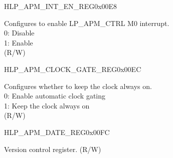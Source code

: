 \begin{register}{H}{LP\_APM\_INT\_EN\_REG}{0x00E8}\label{regdesc:LPAPMINTENREG}
%
%
\regnewline%
\begin{regdesc}\begin{reglist}
\label{fielddesc:LPAPMM0APMINTEN}\item [LP\_APM\_M0\_APM\_INT\_EN] Configures to enable LP\_APM\_CTRL M0 interrupt.\\ 
0: Disable \\ 
1: Enable  \\ (R/W)
\end{reglist}\end{regdesc}
\end{register}


\begin{register}{H}{LP\_APM\_CLOCK\_GATE\_REG}{0x00EC}\label{regdesc:LPAPMCLOCKGATEREG}
%
%
\regnewline%
\begin{regdesc}\begin{reglist}
\label{fielddesc:LPAPMCLKEN}\item [LP\_APM\_CLK\_EN] Configures whether to keep the clock always on.\\ 
0: Enable automatic clock gating \\ 
1: Keep the clock always on  \\ (R/W)
\end{reglist}\end{regdesc}
\end{register}


\begin{register}{H}{LP\_APM\_DATE\_REG}{0x00FC}\label{regdesc:LPAPMDATEREG}
%
%
\regnewline%
\begin{regdesc}\begin{reglist}
\label{fielddesc:LPAPMDATE}\item [LP\_APM\_DATE] Version control register. (R/W)
\end{reglist}\end{regdesc}
\end{register}


